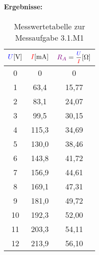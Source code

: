 \documentclass[11pt,a4paper,titlepage]{scrreprt}
\begin{document}
              \paragraph{Ergebnisse:}
                   \begin{center}
                        \begin{table}[!hbtp]
                            \caption{Messwertetabelle zur Messaufgabe 3.1.M1}
                            \label{tbl:messergebnisse3.1}
                            \renewcommand{\arraystretch}{1.3}
                            \begin{center}
                                \begin{tabular}{c|cc}
                                    $\textcolor{blue}{U} [\si{\volt}]$  &
                                    $\textcolor{red}{I} [\si{\milli\ampere}]$ &
                                    $\widerstand{R_A} = \mfrac{\spannung{U}}{\strom{I}} [\si{\ohm}]$\\ \hline

                                    0 & 0 & 0\\
                                    1 & 63,4 & 15,77\\
                                    2 & 83,1 & 24,07\\
                                    3 & 99,5 & 30,15\\
                                    4 &115,3 & 34,69\\
                                    5 & 130,0 & 38,46\\
                                    6 & 143,8 & 41,72\\
                                    7 & 156,9 & 44,61\\
                                    8 & 169,1 & 47,31\\
                                    9 & 181,0 & 49,72\\
                                    10 & 192,3 & 52,00\\
                                    11 & 203,3 & 54,11\\
                                    12 & 213,9 & 56,10\\
                                \end{tabular}
                            \end{center}
                        \end{table}
                    \end{center}
\end{document}
